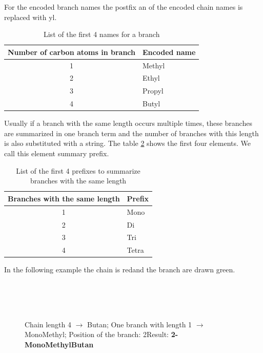 \documentclass[a4paper,10pt]{article}
\newcommand{\gerquot}[1]{\glqq#1\grqq}
\newcommand{\captionVSpace}{\vspace*{-0.05cm}}
\newcommand{\colorChain}{red}
\newcommand{\colorChainName}{\colorChain\space}
\newcommand{\colorBranchOne}{green}
\newcommand{\colorBranchOneName}{\colorBranchOne\space}
\newcommand{\IUPACExample}[1]{\texttt{#1}\\}
\begin{document}
For the encoded branch names the postfix \gerquot{an} of the encoded chain names is replaced with \gerquot{yl}.

\begin{table}[H]
    \centering
    \begin{tabular}{c|l}
        \toprule
        \textbf{Number of carbon atoms in branch} & \textbf{Encoded name} \\
        \midrule
        1 & Methyl \\
        2 & Ethyl \\
        3 & Propyl \\
        4 & Butyl \\
        \bottomrule
    \end{tabular}
    \captionVSpace
    \caption{List of the first 4 names for a branch}
    \label{tab:NumCarbonBranchEncodedName}
\end{table}

Usually if a branch with the same length occurs multiple times, these branches are summarized in one branch term and the number of branches with this length is also substituted with a string. The table \ref{tab:BranchesWithTheSameLength} shows the first four elements. We call this element \gerquot{summary prefix}.

\begin{table}[H]
    \centering
    \begin{tabular}{c|l}
        \toprule
        \textbf{Branches with the same length} & \textbf{Prefix} \\
        \midrule
        1 & Mono \\
        2 & Di \\
        3 & Tri \\
        4 & Tetra \\
        \bottomrule
    \end{tabular}
    \captionVSpace
    \caption{List of the first 4 prefixes to summarize branches with the same length}
    \label{tab:BranchesWithTheSameLength}
\end{table}

In the following example the chain is \colorChainName and the branch are drawn \colorBranchOneName.

\begin{figure}[H]
\noindent\IUPACExample
{
    \color{\colorChain}{C - C - C - C}\\
    \phantom{XXXXX}\color{\colorBranchOne}{|}\\
    \phantom{XXXXX}\color{\colorBranchOne}{C}
}
\caption{Chain length 4 $\rightarrow$ \gerquot{Butan}; One branch with length 1 $\rightarrow$ \gerquot{MonoMethyl}; Position of the branch: 2\space\space\space Result: \textbf{2-MonoMethylButan}}
\end{figure}
\end{document}
